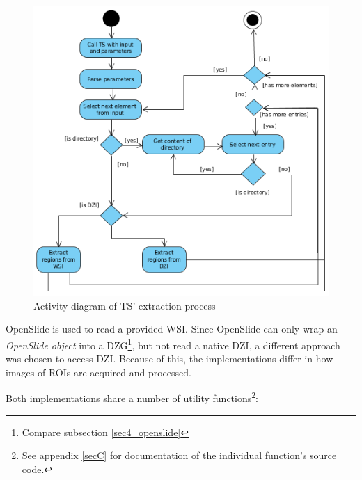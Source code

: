 \begin{figure}[H]	
	\begin{center}
		\includegraphics[scale=0.4]{img/ts_run.png}
		\caption{Activity diagram of TS' extraction process}
		\label{fig5_extractionProcess}
	\end{center}
\end{figure}

OpenSlide is used to read a provided WSI. Since OpenSlide can only wrap an \emph{OpenSlide object} into a DZG\footnote{
	Compare subsection \ref{sec4_openslide}
}, but not read a native DZI\cite{web:openslide}, a different approach was chosen to access DZI. Because of this, the implementations differ in how images of ROIs are acquired and processed.

Both implementations share a number of utility functions\footnote{
	See appendix \ref{secC} for documentation of the individual function's source code.
}:

